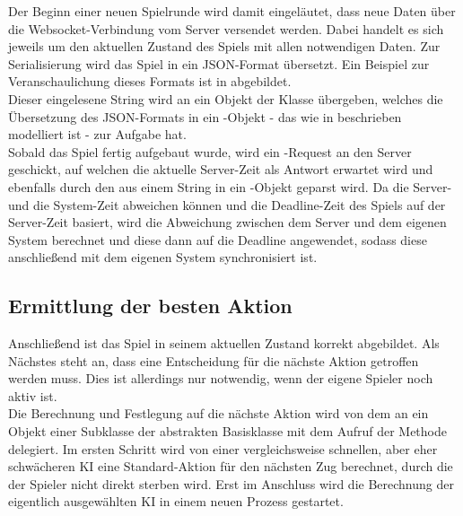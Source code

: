 Der Beginn einer neuen Spielrunde wird damit eingeläutet, dass neue Daten über die Websocket-Verbindung vom Server
versendet werden.
Dabei handelt es sich jeweils um den aktuellen Zustand des Spiels mit allen notwendigen Daten.
Zur Serialisierung wird das Spiel in ein JSON-Format übersetzt.
Ein Beispiel zur Veranschaulichung dieses Formats ist in  abgebildet. \\

Dieser eingelesene String wird an ein Objekt der Klasse  übergeben, welches die Übersetzung des
JSON-Formats in ein -Objekt - das wie in  beschrieben modelliert ist - zur Aufgabe
hat. \\

Sobald das Spiel fertig aufgebaut wurde, wird ein -Request an den Server geschickt, auf welchen
die aktuelle Server-Zeit als Antwort erwartet wird und ebenfalls durch den  aus einem String in ein
-Objekt  geparst wird.
Da die Server- und die System-Zeit abweichen können und die Deadline-Zeit des Spiels auf der Server-Zeit basiert,
wird die Abweichung zwischen dem Server und dem eigenen System berechnet und diese dann auf die Deadline angewendet,
sodass diese anschließend mit dem eigenen System synchronisiert ist.

\subsection{Ermittlung der besten Aktion}
\label{subsec:ermitteln-aktion}

Anschließend ist das Spiel in seinem aktuellen Zustand korrekt abgebildet.
Als Nächstes steht an, dass eine Entscheidung für die nächste Aktion getroffen werden muss.
Dies ist allerdings nur notwendig, wenn der eigene Spieler noch aktiv ist. \\

Die Berechnung und Festlegung auf die nächste Aktion wird von dem  an ein Objekt einer
Subklasse der abstrakten Basisklasse  mit dem Aufruf der Methode
 delegiert.
Im ersten Schritt wird von einer vergleichsweise schnellen, aber eher schwächeren \ac{KI} eine Standard-Aktion für den
nächsten Zug berechnet, durch die der Spieler nicht direkt sterben wird.
Erst im Anschluss wird die Berechnung der eigentlich ausgewählten \ac{KI} in einem neuen Prozess gestartet. \\

